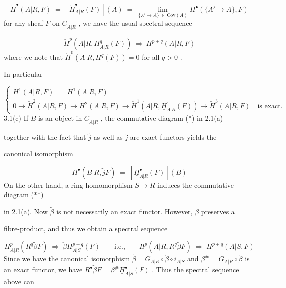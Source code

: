 \begin{equation*}
\check{H}^{\bullet}(A|R,F) \;=\; [\check{H}^{\bullet}_{A|R}(F)](A) \;=\; \lim_{\{A' \to A\}\, \in\, \mathrm{Cov}(A)} H^{\bullet}(\{A' \to A\},F)
\end{equation*}
for any sheaf  $F$  on  $\underline{C}_{A|R}$  , we have the usual spectral sequence

\begin{equation*}
\check{H}^{p}(A|R,\underline{H}^{q}_{A|R}(F)) \;\Rightarrow\; H^{p+q}(A|R,F)
\end{equation*}
where we note that  $\check{H}^{0}(A|R,\underline{H}^{q}(F)) = 0$  for all  $q > 0$ .

In particular

\begin{equation*}
\left\{
\begin{array}{l}
H^{1}(A|R,F) \;=\; H^{1}(A|R,F) \\[2ex]
0 \to \check{H}^{2}(A|R,F) \to H^{2}(A|R,F) \to \check{H}^{1}(A|R,\underline{H}^{1}_{A\ R}(F)) \to \check{H}^{3}(A|R,F) \quad \text{is exact.}
\end{array}
\right.
\end{equation*}
3.1(c)   If  $B$  is an object in  $\underline{C}_{A|R}$  , the commutative diagram (*) in 2.1(a)

together with the fact that  $\tilde{j}$  as well as  $\check{j}$  are exact functors yields the

canonical isomorphism

\begin{equation*}
H^{\bullet}(B|R,\tilde{j}F) \;=\; [\underline{H}^{\bullet}_{A|R}(F)](B)
\end{equation*}
On the other hand, a ring homomorphism  $S → R$  induces the commutative diagram (**)

in 2.1(a). Now  $\tilde{\beta}$  is not necessarily an exact functor. However,  $β$  preserves a

fibre-product, and thus we obtain a spectral sequence

\begin{equation*}
\underline{H}^{p}_{A|R}(R^{q}\tilde{\beta}F) \;\Rightarrow\; \check{\beta}\underline{H}^{p+q}_{A|S}(F) \qquad \text{i.e.,} \qquad H^{p}(A|R,R^{q}\tilde{\beta}F) \;\Rightarrow\; H^{p+q}(A|S,F)
\end{equation*}
Since we have the canonical isomorphism  $\tilde{\beta} = G_{A|R}\circ\check{\beta}\circ i_{A|S}$  and  $\beta^{\#} = G_{A|R}\circ\check{\beta}$  is an
exact functor, we have  $R^{\bullet}\tilde{\beta}F = \beta^{\#}\underline{H}^{\bullet}_{A|S}(F)$  . Thus the spectral sequence above can

